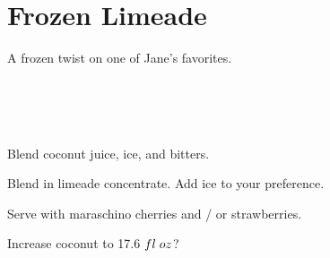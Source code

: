 \section[Frozen Limeade]{Frozen Limeade~\vegan}




\begin{recipestats}[
	servings=8 people,
	preptime=10 \minute,
	source=Mike \& Jane,
]
\end{recipestats}


\begin{recipeabstract}
	A frozen twist on one of Jane's favorites.
\end{recipeabstract}


\begin{ingredientcolumns}[1]
	\begin{ingredientblock}
		\\
		\\
		\\
	\end{ingredientblock}
\end{ingredientcolumns}


\begin{preparation}
\item Blend coconut juice, ice, and bitters.

\item Blend in limeade concentrate.
	Add ice to your preference.
\end{preparation}


\begin{variation}
\item Serve with maraschino cherries and / or strawberries.
\end{variation}


\begin{experiments}
\item Increase coconut to 17.6 $fl\;oz$?
\end{experiments}

\recipeend
